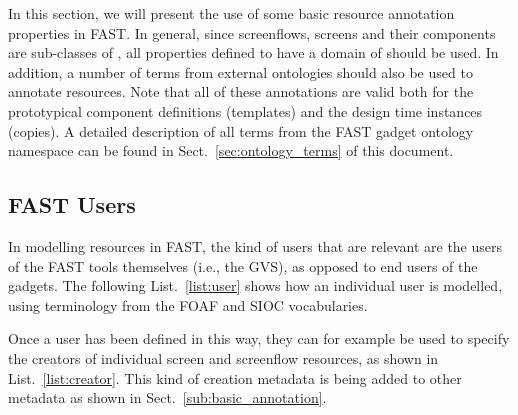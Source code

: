\documentclass[twoside]{fast_latex}
\begin{document}
In this section, we will present the use of some basic resource annotation properties in FAST. In general, since screenflows, screens and their components are sub-classes of , all properties defined to have a domain of  should be used. In addition, a number of terms from external ontologies should also be used to annotate resources. Note that all of these annotations are valid both for the prototypical component definitions (templates) and the design time instances (copies). A detailed description of all terms from the FAST gadget ontology namespace can be found in Sect.~\ref{sec:ontology_terms} of this document.

\singlespacing
{}
\begin{figure}[ht]
	
\end{figure}
\doublespacing


\subsection{FAST Users} %
\label{sub:fast_users}

In modelling resources in FAST, the kind of users that are relevant are the users of the FAST tools themselves (i.e., the GVS), as opposed to end users of the gadgets. The following List.~\ref{list:user} shows how an individual user is modelled, using terminology from the FOAF and SIOC vocabularies.

\singlespacing
{}
\begin{figure}[ht]
	
\end{figure}
\doublespacing

Once a user has been defined in this way, they can for example be used to specify the creators of individual screen and screenflow resources, as shown in List.~\ref{list:creator}. This kind of creation metadata is being added to other metadata as shown in Sect.~\ref{sub:basic_annotation}.

\singlespacing
{}
\begin{figure}[ht]
	
\end{figure}
\doublespacing
\end{document}
